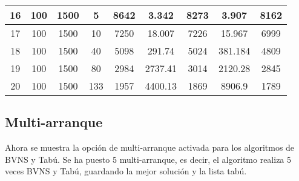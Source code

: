 \begin{center}
\begin{adjustbox}{max width=\textwidth}
\begin{tabular}{|c|c|c|c|c|c|c|c|c|}
		16 & 100 & 1500 & 5   & 8642	 & 3.342    & 8273     & 3.907    & 8162      \\ \hline
		17 & 100 & 1500 & 10  & 7250	 & 18.007   & 7226     & 15.967   & 6999      \\ \hline
		18 & 100 & 1500 & 40  & 5098	 & 291.74   & 5024     & 381.184  & 4809      \\ \hline
		19 & 100 & 1500 & 80  & 2984	 & 2737.41  & 3014     & 2120.28  & 2845      \\ \hline
		20 & 100 & 1500 & 133 & 1957	 & 4400.13  & 1869     & 8906.9   & 1789      \\ \hline
	\end{tabular}
\end{adjustbox}
\end{center}

\subsection{Multi-arranque}
Ahora se muestra la opción de multi-arranque activada para los algoritmos de BVNS y Tabú. Se ha puesto 5 multi-arranque, es decir, el algoritmo realiza 5 veces BVNS y Tabú, guardando la mejor solución y la lista tabú.
